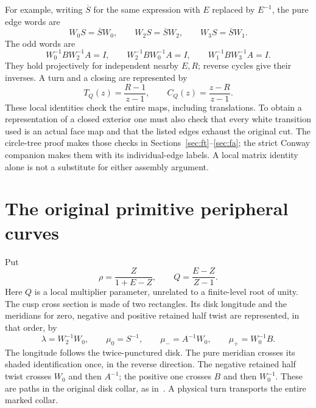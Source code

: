 For example, writing \(\overline S\) for the same expression with
\(E\) replaced by \(E^{-1}\), the pure edge words are
\[
 W_0S=\overline S W_0,\qquad W_2S=\overline S W_2,\qquad
 W_3S=\overline S W_1.
\]
The odd words are
\[
 W_0^{-1}BW_2^{-1}A=I,\qquad
 W_2^{-1}BW_0^{-1}A=I,\qquad
 W_1^{-1}BW_3^{-1}A=I.
\]
They hold projectively for independent nearby \(E,R\); reverse cycles
give their inverses. A turn and a closing are represented by
\[
 T_Q(z)=\frac{R-1}{z-1},\qquad C_Q(z)=\frac{z-R}{z-1}.
\]
These local identities check the entire maps, including translations.
To obtain a representation of a closed exterior one must also check
that every white transition used is an actual face map and that the
listed edges exhaust the original cut. The circle-tree proof makes
those checks in Sections~\ref{sec:ft}--\ref{sec:fa}; the strict Conway
companion makes them with its individual-edge labels. A local matrix
identity alone is not a substitute for either assembly argument.

\section{The original primitive peripheral curves}

Put
\[
 \rho=\frac{Z}{1+E-Z},\qquad Q=\frac{E-Z}{Z-1}.
\]
Here \(Q\) is a local multiplier parameter, unrelated to a
finite-level root of unity. The cusp cross section is made of two rectangles. Its disk longitude
and the meridians for zero, negative and positive retained half twist
are represented, in that order, by
\[
 \lambda=W_2^{-1}W_0,\qquad
 \mu_0=S^{-1},\qquad
 \mu_-=A^{-1}W_0,\qquad \mu_+=W_0^{-1}B.
\]
The longitude follows the twice-punctured disk. The pure meridian
crosses its shaded identification once, in the reverse direction.
The negative retained half twist crosses \(W_0\) and then \(A^{-1}\);
the positive one crosses \(B\) and then \(W_0^{-1}\). These are paths
in the original disk collar, as in~\cite[Section~5]{StrictGeometry}.
A physical turn transports the entire marked collar.


